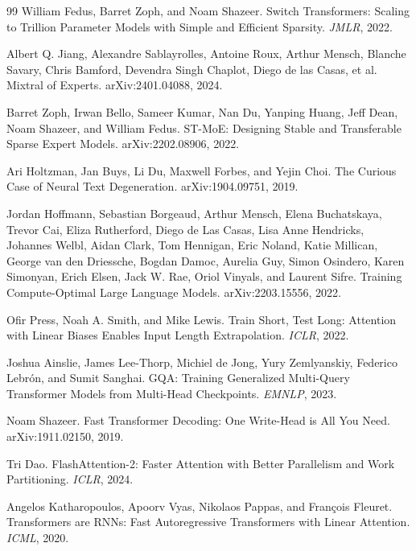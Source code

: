 \documentclass[11pt,a4paper]{article}
\theoremstyle{definition}
\theoremstyle{plain}
\begin{document}
\begin{thebibliography}{99}
William Fedus, Barret Zoph, and Noam Shazeer.
\newblock Switch Transformers: Scaling to Trillion Parameter Models with Simple and Efficient Sparsity.
\newblock \emph{JMLR}, 2022.

Albert Q. Jiang, Alexandre Sablayrolles, Antoine Roux, Arthur Mensch, Blanche Savary, Chris Bamford, Devendra Singh Chaplot, Diego de las Casas, et al.
\newblock Mixtral of Experts.
\newblock arXiv:2401.04088, 2024.

Barret Zoph, Irwan Bello, Sameer Kumar, Nan Du, Yanping Huang, Jeff Dean, Noam Shazeer, and William Fedus.
\newblock ST-MoE: Designing Stable and Transferable Sparse Expert Models.
\newblock arXiv:2202.08906, 2022.

Ari Holtzman, Jan Buys, Li Du, Maxwell Forbes, and Yejin Choi.
\newblock The Curious Case of Neural Text Degeneration.
\newblock arXiv:1904.09751, 2019.

Jordan Hoffmann, Sebastian Borgeaud, Arthur Mensch, Elena Buchatskaya, Trevor Cai, Eliza Rutherford, Diego de Las Casas, Lisa Anne Hendricks, Johannes Welbl, Aidan Clark, Tom Hennigan, Eric Noland, Katie Millican, George van den Driessche, Bogdan Damoc, Aurelia Guy, Simon Osindero, Karen Simonyan, Erich Elsen, Jack W. Rae, Oriol Vinyals, and Laurent Sifre.
\newblock Training Compute-Optimal Large Language Models.
\newblock arXiv:2203.15556, 2022.

Ofir Press, Noah A. Smith, and Mike Lewis.
\newblock Train Short, Test Long: Attention with Linear Biases Enables Input Length Extrapolation.
\newblock \emph{ICLR}, 2022.

Joshua Ainslie, James Lee-Thorp, Michiel de Jong, Yury Zemlyanskiy, Federico Lebr\'on, and Sumit Sanghai.
\newblock GQA: Training Generalized Multi-Query Transformer Models from Multi-Head Checkpoints.
\newblock \emph{EMNLP}, 2023.

Noam Shazeer.
\newblock Fast Transformer Decoding: One Write-Head is All You Need.
\newblock arXiv:1911.02150, 2019.

Tri Dao.
\newblock FlashAttention-2: Faster Attention with Better Parallelism and Work Partitioning.
\newblock \emph{ICLR}, 2024.

Angelos Katharopoulos, Apoorv Vyas, Nikolaos Pappas, and Fran\c{c}ois Fleuret.
\newblock Transformers are RNNs: Fast Autoregressive Transformers with Linear Attention.
\newblock \emph{ICML}, 2020.


\end{thebibliography}
\end{document}
